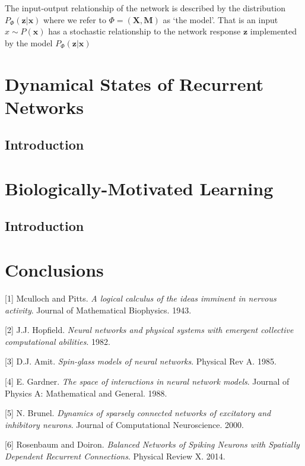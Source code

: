 \documentclass{ucetd}
\begin{document}
The input-output relationship of the network is described by the distribution $P_{\Phi}(\mathbf{z}|\mathbf{x})$ where we refer to $\Phi = \left(\mathbf{X}, \mathbf{M}\right)$ as `the model'. That is an input $x \sim P(\mathbf{x})$ has a stochastic relationship to the network response $\mathbf{z}$ implemented by the model $P_{\Phi}(\mathbf{z}|\mathbf{x})$ 


\chapter{Dynamical States of Recurrent Networks}
\section{Introduction}


\chapter{Biologically-Motivated Learning}
\section{Introduction}

\chapter{Conclusions}


\makebibliography

[1] Mculloch and Pitts. \textit{A logical calculus of the ideas imminent in nervous activity}. Journal of Mathematical Biophysics. 1943.

[2] J.J. Hopfield. \textit{Neural networks and physical systems with emergent collective computational abilities}. 1982.

[3] D.J. Amit. \textit{Spin-glass models of neural networks}. Physical Rev A. 1985.

[4] E. Gardner. \textit{The space of interactions in neural network models}. Journal of Physics A: Mathematical and General. 1988.

[5] N. Brunel. \textit{Dynamics of sparsely connected networks of excitatory and inhibitory neurons}. Journal of Computational Neuroscience. 2000. 

[6] Rosenbaum and Doiron. \textit{Balanced Networks of Spiking Neurons with Spatially Dependent Recurrent Connections}. Physical Review X. 2014.
\end{document}
